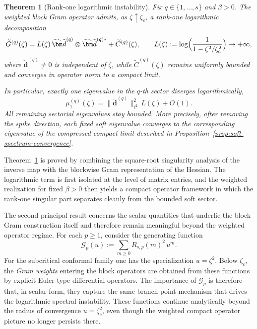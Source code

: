 \documentclass[11pt]{amsart}
\numberwithin{equation}{section}
\theoremstyle{plain}
\newtheorem{maintheorem}{Theorem}
\theoremstyle{definition}
\theoremstyle{remark}
\begin{document}
\begin{maintheorem}[Rank-one logarithmic instability]
	\label{thm:A}
	Fix \(q\in\{1,\dots,s\}\) and \(\beta>0\). The weighted block Gram
	operator admits, as \(\zeta\uparrow\zeta_c\), a rank-one logarithmic
	decomposition
	\[
		\widetilde G^{(q)}(\zeta)
		=
		L(\zeta)\,\widetilde{\bm d}^{(q)}\otimes \widetilde{\bm d}^{(q)*}
		+\widetilde C^{(q)}(\zeta),
		\qquad
		L(\zeta):=\log\Bigl(\frac{1}{1-\zeta^2/\zeta_c^2}\Bigr)\to+\infty,
	\]
	where \(\widetilde{\bm d}^{(q)}\neq0\) is independent of \(\zeta\), while
	\(\widetilde C^{(q)}(\zeta)\) remains uniformly bounded and converges in
	operator norm to a compact limit.

	In particular, exactly one eigenvalue in the \(q\)-th sector diverges
	logarithmically,
	\[
		\mu_1^{(q)}(\zeta)
		=
		\|\widetilde{\bm d}^{(q)}\|_{\ell^2}^2\,L(\zeta)+O(1).
	\]
	All remaining sectorial eigenvalues stay bounded. More precisely, after
	removing the spike direction, each fixed soft eigenvalue converges to the
	corresponding eigenvalue of the compressed compact limit described in
	Proposition~\ref{prop:soft-spectrum-convergence}.
\end{maintheorem}

Theorem~\ref{thm:A} is proved by combining the square-root singularity analysis of the
inverse map with the blockwise Gram representation of the Hessian. The
logarithmic term is first isolated at the level of matrix entries, and the
weighted realization for fixed \(\beta>0\) then yields a compact operator
framework in which the rank-one singular part separates cleanly from the
bounded soft sector.

The second principal result concerns the scalar quantities that underlie the
block Gram construction itself and therefore remain meaningful beyond the
weighted operator regime. For each \(p\ge1\), consider the generating
function
\begin{equation}\label{eq:intro-Gp}
	\mathcal G_p(u)
	:=
	\sum_{m\ge0}R_{s,p}(m)^2\,u^m.
\end{equation}
For the subcritical conformal family one has the specialization \(u=\zeta^2\).
Below \(\zeta_c\), the \emph{Gram weights} entering the block operators are
obtained from these functions by explicit Euler-type differential operators.
The importance of \(\mathcal G_p\) is therefore that, in scalar form, they
capture the same branch-point mechanism that drives the logarithmic spectral
instability. These functions continue analytically beyond the radius of
convergence \(u=\zeta_c^2\), even though the weighted compact operator
picture no longer persists there.
\end{document}
